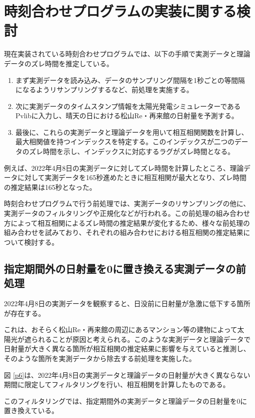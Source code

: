 \documentclass[a4j,12pt,]{jarticle}
\begin{document}
\section{時刻合わせプログラムの実装に関する検討}
現在実装されている時刻合わせプログラムでは、以下の手順で実測データと理論データのズレ時間を推定している。

\begin{enumerate}
\item まず実測データを読み込み、データのサンプリング間隔を1秒ごとの等間隔になるようリサンプリングするなど、前処理を実施する。
\item 次に実測データのタイムスタンプ情報を太陽光発電シミュレーターであるPvlibに入力し、晴天の日における松山Re・再来館の日射量を予測する。
\item 最後に、これらの実測データと理論データを用いて相互相関関数を計算し、最大相関値を持つインデックスを特定する。このインデックスが二つのデータのズレ時間を示し、インデックスに対応するラグがズレ時間となる。
\end{enumerate}

例えば、2022年4月8日の実測データに対してズレ時間を計算したところ、理論データに対して実測データを165秒進めたときに相互相関が最大となり、ズレ時間の推定結果は165秒となった。

時刻合わせプログラムで行う前処理では、実測データのリサンプリングの他に、実測データのフィルタリングや正規化などが行われる。この前処理の組み合わせ方によって相互相関によるズレ時間の推定結果が変化するため、様々な前処理の組み合わせを試みており、それぞれの組み合わせにおける相互相関の推定結果について検討する。

\subsection{指定期間外の日射量を0に置き換える実測データの前処理}
2022年4月8日の実測データを観察すると、日没前に日射量が急激に低下する箇所が存在する。

これは、おそらく松山Re・再来館の周辺にあるマンション等の建物によって太陽光が遮られることが原因と考えられる。このような実測データと理論データで日射量が大きく異なる箇所が相互相関の推定結果に影響を与えていると推測し、そのような箇所を実測データから除去する前処理を実施した。

図 \ref{p6}は、2022年4月8日の実測データと理論データの日射量が大きく異ならない期間に限定してフィルタリングを行い、相互相関を計算したものである。

このフィルタリングでは、指定期間外の実測データと理論データの日射量を0に置き換えている。
\end{document}
